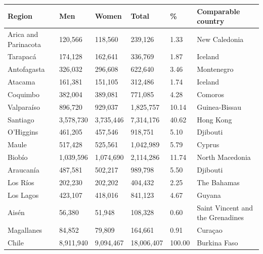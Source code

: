 \documentclass{article}
\begin{document}
\begin{tabular}{llllll}
\toprule
Region & Men & Women & Total & \% & Comparable country \\
\midrule
Arica and Parinacota & 120,566 & 118,560 & 239,126 & 1.33 & New Caledonia \\
Tarapacá & 174,128 & 162,641 & 336,769 & 1.87 & Iceland \\
Antofagasta & 326,032 & 296,608 & 622,640 & 3.46 & Montenegro \\
Atacama & 161,381 & 151,105 & 312,486 & 1.74 & Iceland \\
Coquimbo & 382,004 & 389,081 & 771,085 & 4.28 & Comoros \\
Valparaíso & 896,720 & 929,037 & 1,825,757 & 10.14 & Guinea-Bissau \\
Santiago & 3,578,730 & 3,735,446 & 7,314,176 & 40.62 & Hong Kong \\
O'Higgins & 461,205 & 457,546 & 918,751 & 5.10 & Djibouti \\
Maule & 517,428 & 525,561 & 1,042,989 & 5.79 & Cyprus \\
Biobío & 1,039,596 & 1,074,690 & 2,114,286 & 11.74 & North Macedonia \\
Araucanía & 487,581 & 502,217 & 989,798 & 5.50 & Djibouti \\
Los Ríos & 202,230 & 202,202 & 404,432 & 2.25 & The Bahamas \\
Los Lagos & 423,107 & 418,016 & 841,123 & 4.67 & Guyana \\
Aisén & 56,380 & 51,948 & 108,328 & 0.60 & Saint Vincent and the Grenadines \\
Magallanes & 84,852 & 79,809 & 164,661 & 0.91 & Curaçao \\
Chile & 8,911,940 & 9,094,467 & 18,006,407 & 100.00 & Burkina Faso \\
\bottomrule
\end{tabular}
\end{document}
